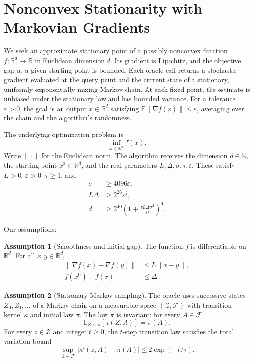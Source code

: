 \documentclass[10pt]{article}
\theoremstyle{definition}
\newtheorem{assumption}{Assumption}
\begin{document}
\section*{Nonconvex Stationarity with Markovian Gradients}
We seek an approximate stationary point of a possibly nonconvex function $f:\mathbb{R}^d\to\mathbb{R}$ in Euclidean dimension $d$. Its gradient is Lipschitz, and the objective gap at a given starting point is bounded. Each oracle call returns a stochastic gradient evaluated at the query point and the current state of a stationary, uniformly exponentially mixing Markov chain. At each fixed point, the estimate is unbiased under the stationary law and has bounded variance. For a tolerance $\varepsilon>0$, the goal is an output $\bar{x}\in\mathbb{R}^d$ satisfying $\mathbb{E}\|\nabla f(\bar{x})\|\leq\varepsilon$, averaging over the chain and the algorithm's randomness.

The underlying optimization problem is
\[
\inf_{x\in\mathbb{R}^d} f(x).
\]
Write $\|\cdot\|$ for the Euclidean norm. The algorithm receives the dimension $d\in\mathbb{N}$, the starting point $x^0\in\mathbb{R}^d$, and the real parameters $L,\Delta,\sigma,\tau,\varepsilon$. These satisfy $L>0$, $\varepsilon>0$, $\tau\geq 1$, and
\[
\begin{aligned}
\sigma &\geq 4096\varepsilon,\\
L\Delta &\geq 2^{26}\varepsilon^2,\\
d &\geq 2^{40}\left(1+\frac{\tau L\Delta\sigma^2}{\varepsilon^4}\right)^4.
\end{aligned}
\]

Our assumptions:
\begin{assumption}[Smoothness and initial gap]
The function $f$ is differentiable on $\mathbb{R}^d$. For all $x,y\in\mathbb{R}^d$,
\[
\begin{aligned}
\|\nabla f(x)-\nabla f(y)\| &\leq L\|x-y\|,\\
f(x^0)-f(x) &\leq \Delta.
\end{aligned}
\]
\end{assumption}

\begin{assumption}[Stationary Markov sampling]
The oracle uses successive states $Z_0,Z_1,\ldots$ of a Markov chain on a measurable space $(\mathcal Z,\mathcal F)$ with transition kernel $\kappa$ and initial law $\pi$. The law $\pi$ is invariant: for every $A\in\mathcal F$,
\[
\mathbb{E}_{Z\sim\pi}[\kappa(Z,A)]=\pi(A).
\]
For every $z\in\mathcal Z$ and integer $t\geq 0$, the $t$-step transition law satisfies the total variation bound
\[
\sup_{A\in\mathcal F}\big|\kappa^t(z,A)-\pi(A)\big|
\leq 2\exp(-t/\tau).
\]
\end{assumption}
\end{document}
